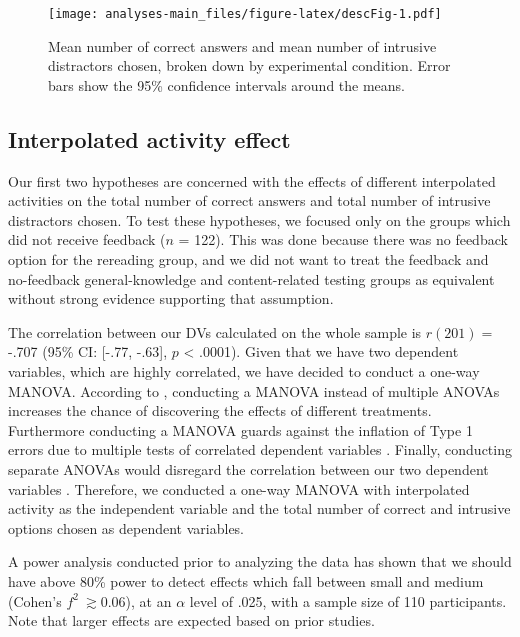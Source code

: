 \documentclass[
  11pt,
]{article}
\begin{document}
\begin{figure}
\centering
\texttt{[image: analyses-main\_files/figure-latex/descFig-1.pdf]}
\caption{Mean number of correct answers and mean number of intrusive
distractors chosen, broken down by experimental condition. Error bars
show the 95\% confidence intervals around the means.}
\end{figure}

\hypertarget{interpolated-activity-effect}{%
\subsection{Interpolated activity
effect}\label{interpolated-activity-effect}}

Our first two hypotheses are concerned with the effects of different
interpolated activities on the total number of correct answers and total
number of intrusive distractors chosen. To test these hypotheses, we
focused only on the groups which did not receive feedback (\(n\) = 122).
This was done because there was no feedback option for the rereading
group, and we did not want to treat the feedback and no-feedback
general-knowledge and content-related testing groups as equivalent
without strong evidence supporting that assumption.

The correlation between our DVs calculated on the whole sample is
\(r(201) =\) -.707 (95\% CI: {[}-.77, -.63{]}, \(p\) \textless{} .0001).
Given that we have two dependent variables, which are highly correlated,
we have decided to conduct a one-way MANOVA. According to
\citet{tabachnickUsingMultivariateStatistics2012}, conducting a MANOVA
instead of multiple ANOVAs increases the chance of discovering the
effects of different treatments. Furthermore conducting a MANOVA guards
against the inflation of Type 1 errors due to multiple tests of
correlated dependent variables
\citep{tabachnickUsingMultivariateStatistics2012,fieldDiscoveringStatisticsUsing2012}.
Finally, conducting separate ANOVAs would disregard the correlation
between our two dependent variables
\citep{fieldDiscoveringStatisticsUsing2012}. Therefore, we conducted a
one-way MANOVA with interpolated activity as the independent variable
and the total number of correct and intrusive options chosen as
dependent variables.

A power analysis conducted prior to analyzing the data
\citep[using the G*Power software by][]{faulStatisticalPowerAnalyses2009}
has shown that we should have above 80\% power to detect effects which
fall between small and medium (Cohen's \(f^2\ \gtrsim 0.06\)), at an
\(\alpha\) level of .025, with a sample size of 110 participants. Note
that larger effects are expected based on prior studies.
\end{document}
